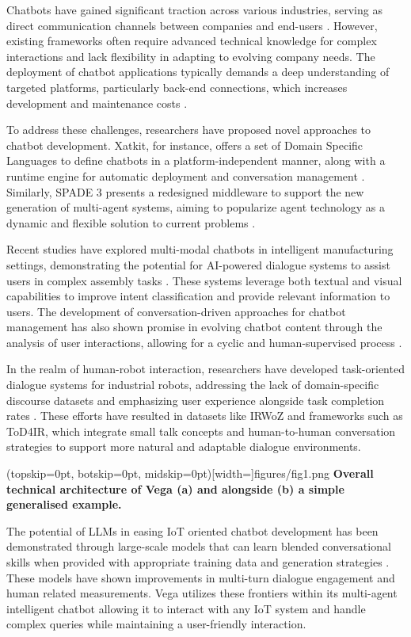 \documentclass{ieeeaccess}
\begin{document}
Chatbots have gained significant traction across various industries, serving as direct communication channels between companies and end-users \cite{8960373}. However, existing frameworks often require advanced technical knowledge for complex interactions and lack flexibility in adapting to evolving company needs. The deployment of chatbot applications typically demands a deep understanding of targeted platforms, particularly back-end connections, which increases development and maintenance costs \cite{8960373}.

To address these challenges, researchers have proposed novel approaches to chatbot development. Xatkit, for instance, offers a set of Domain Specific Languages to define chatbots in a platform-independent manner, along with a runtime engine for automatic deployment and conversation management \cite{8960373}. Similarly, SPADE 3 presents a redesigned middleware to support the new generation of multi-agent systems, aiming to popularize agent technology as a dynamic and flexible solution to current problems \cite{9207929}. 

Recent studies have explored multi-modal chatbots in intelligent manufacturing settings, demonstrating the potential for AI-powered dialogue systems to assist users in complex assembly tasks \cite{9440470}. These systems leverage both textual and visual capabilities to improve intent classification and provide relevant information to users. The development of conversation-driven approaches for chatbot management has also shown promise in evolving chatbot content through the analysis of user interactions, allowing for a cyclic and human-supervised process \cite{9681834}.

In the realm of human-robot interaction, researchers have developed task-oriented dialogue systems for industrial robots, addressing the lack of domain-specific discourse datasets and emphasizing user experience alongside task completion rates \cite{9869659}. These efforts have resulted in datasets like IRWoZ and frameworks such as ToD4IR, which integrate small talk concepts and human-to-human conversation strategies to support more natural and adaptable dialogue environments.

\Figure[t!](topskip=0pt, botskip=0pt,
midskip=0pt)[width=\textwidth]{{figures/fig1.png}}
{ \centering \textbf{Overall technical architecture of Vega (a) and alongside (b) a simple generalised example.}\label{fig1}}

The potential of LLMs in easing IoT oriented chatbot development has been demonstrated through large-scale models that can learn blended conversational skills when provided with appropriate training data and generation strategies \cite{roller-etal-2021-recipes}. These models have shown improvements in multi-turn dialogue engagement and human related measurements. Vega utilizes these frontiers within its multi-agent intelligent chatbot allowing it to interact with any IoT system and handle complex queries while maintaining a user-friendly interaction.
\end{document}
